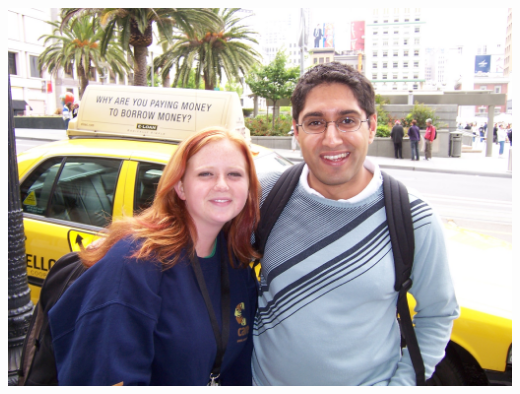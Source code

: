 \documentclass[a5paper,titlepage,11pt]{book}
\begin{document}
\begin{center}\includegraphics[width=\textwidth]{gfx/100_1016}\end{center}
\end{document}
